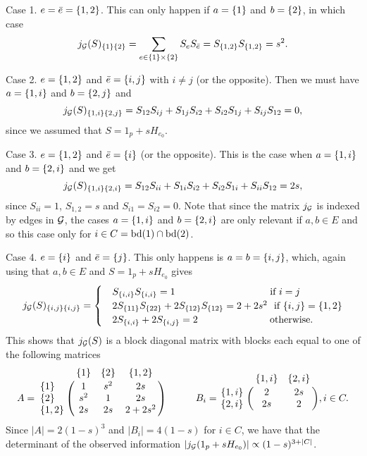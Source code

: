 Case 1. $e = \bar e = {\left\{1, 2\right\}}$. This can only happen if $a = {\left\{1\right\}}$ and $b = {\left\{2\right\}}$, in which case
\begin{equation*}
    j_{\mathcal{G}}(S)_{{\left\{1\right\}} {\left\{2\right\}}} = \sum_{e \in {\left\{1\right\}} \times {\left\{2\right\}}} S_e S_{\bar e} = S_{{\left\{1, 2\right\}}}S_{{\left\{1, 2\right\}}} = s^2.
\end{equation*}

Case 2. $e = {\left\{1, 2\right\}}$ and $\bar e = {\left\{i, j\right\}}$ with $i \neq j$ (or the opposite). Then we must have $a = {\left\{1, i\right\}}$ and $b = {\left\{2, j\right\}}$ and
\begin{equation*}
    j_{\mathcal{G}}(S)_{{\left\{1, i\right\}} {\left\{2, j\right\}}} = S_{1 2}S_{i j} + S_{1 j} S_{i 2} + S_{i 2} S_{1 j} + S_{i j} S_{1 2} = 0,
\end{equation*}
since we assumed that $S = 1_p + s H_{e_0}$.

Case 3. $e = {\left\{1, 2\right\}}$ and $\bar e = {\left\{i\right\}}$ (or the opposite). This is the case when $a = {\left\{1, i\right\}}$ and $b = {\left\{2, i\right\}}$ and we get
\begin{equation*}
    j_{\mathcal{G}}(S)_{{\left\{1, i\right\}} {\left\{2, i\right\}}} = 
    S_{1 2}S_{i i} + S_{1 i} S_{i 2} + S_{i 2} S_{1 i} + S_{i i} S_{1 2} = 2 s,
\end{equation*}
since $S_{i i} = 1$, $S_{1, 2} = s$ and $S_{i 1} = S_{i 2} = 0$. Note that since the matrix $j_{\mathcal{G}}$ is indexed by edges in ${\mathcal{G}}$, the cases $a = {\left\{1, i\right\}}$ and $b = {\left\{2, i\right\}}$ are only relevant if $a, b \in E$ and so this case only for $i \in C = {\textrm{bd}}(1) \cap {\textrm{bd}}(2)$.

Case 4. $e = {\left\{i\right\}}$ and $\bar e = {\left\{j\right\}}$. This only happens is $a = b = {\left\{i, j\right\}}$, which, again using that $a, b \in E$ and $S = 1_p + sH_{e_0}$ gives
\begin{equation*}
    j_\G(S)_{\eset{i, j} \eset{i, j}} = \begin{cases}
        &S_\eset{i, i}S_\eset{i, i} = 1\ \ \ \ \ \ \ \ \ \ \ \ \ \ \ \ \ \ \ \ \ \ \ \ \ \ \ \  \t{ if } i = j\\
        &2S_\eset{1 1}S_\eset{2 2} + 2S_\eset{1 2}S_\eset{1 2} = 2 + 2s^2\  \t{ if } \eset{i, j} = \eset{1, 2}\\
        &2S_\eset{i,i} + 2S_\eset{i, j} = 2\ \ \ \ \ \ \ \ \ \ \ \ \ \ \ \ \ \ \ \ \  \t{ otherwise.}
    \end{cases}
\end{equation*}
This shows that $j_{\mathcal{G}}(S)$ is a block diagonal matrix with blocks each equal to one of the following matrices
\begin{equation*}
    A = \bordermatrix{~ & \eset{1} & \eset{2} & \eset{1, 2} \cr
        \eset{1} & 1 & s^2 & 2s \cr
        \eset{2} & s^2 & 1 & 2s \cr
        \eset{1, 2} & 2s & 2s & 2 + 2s^2 \cr
    }
    \ \ \ \ \ \ \ \ \ 
    B_i = \bordermatrix{~ & \eset{1, i} & \eset{2, i} \cr
        \eset{1, i} & 2 & 2s \cr
        \eset{2, i} & 2s & 2 \cr
    }, i \in C.
\end{equation*}
Since $|A| = 2 (1-s)^3$ and $|B_i| = 4(1-s)$ for $i \in C$, we have that the determinant of the observed information $\left|j_{\mathcal{G}}(1_p + sH_{e_0})\right| \propto (1-s)^{3 + |C|}$.